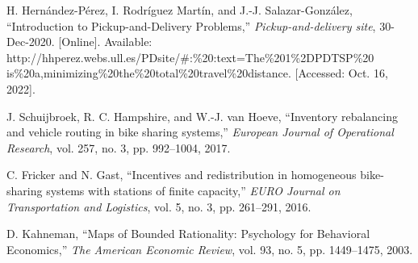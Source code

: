 \documentclass[conference]{IEEEtran}
\begin{document}
\begin{thebibliography}{00}
H. Hernández-Pérez, I. Rodríguez Martín, and J.-J. Salazar-González, ``Introduction to Pickup-and-Delivery Problems,'' \emph{Pickup-and-delivery site}, 30-Dec-2020. [Online]. Available: http://hhperez.webs.ull.es/PDsite/\#:\%20:text=The\%201\%2DPDTSP\%20 is\%20a,minimizing\%20the\%20total\%20travel\%20distance. [Accessed: Oct. 16, 2022]. 

J. Schuijbroek, R. C. Hampshire, and W.-J. van Hoeve, ``Inventory rebalancing and vehicle routing in bike sharing systems,'' \emph{European Journal of Operational Research}, vol. 257, no. 3, pp. 992–1004, 2017. 

C. Fricker and N. Gast, ``Incentives and redistribution in homogeneous bike-sharing systems with stations of finite capacity,'' \emph{EURO Journal on Transportation and Logistics}, vol. 5, no. 3, pp. 261–291, 2016. 

D. Kahneman, ``Maps of Bounded Rationality: Psychology for Behavioral Economics,'' \emph{The American Economic Review}, vol. 93, no. 5, pp. 1449–1475, 2003. 

\end{thebibliography}
\end{document}
